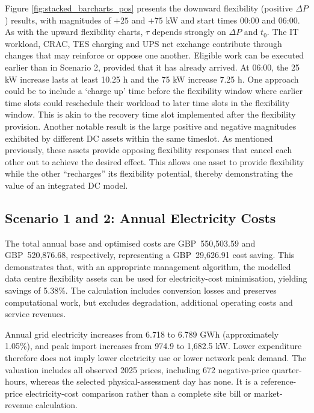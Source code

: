 \documentclass[lettersize,journal]{IEEEtran}
\newcommand{\rev}[1]{#1}
\begin{document}
\rev{Figure \ref{fig:stacked_barcharts_pos} presents the downward flexibility (positive $\Delta P$) results, with magnitudes of $+25$ and $+75$ kW and start times 00:00 and 06:00.} As  with the upward flexibility charts, $\tau$ depends strongly on  $\Delta P$ and $t_0$. The IT workload, CRAC, TES charging and UPS net exchange contribute through changes that may reinforce or oppose one another. Eligible work can be executed earlier than in Scenario 2, provided that it has already arrived. At 06:00, the 25 kW increase lasts at least 10.25 h and the 75 kW increase 7.25 h. One approach could be to include a `charge up' time before the flexibility window where earlier time slots could reschedule their workload to later time slots in the flexibility window. This is akin to the recovery time slot implemented after the flexibility provision. Another notable result is the large positive and negative magnitudes exhibited by different DC assets within the same timeslot. As mentioned previously, these assets provide opposing flexibility responses that cancel each other out to achieve the desired effect. This allows one asset to provide flexibility while the other ``recharges'' its flexibility potential, thereby demonstrating the value of an integrated DC model.

\subsection{Scenario 1 and 2: Annual Electricity Costs}
\rev{The total annual base and optimised costs are GBP~550,503.59 and GBP~520,876.68, respectively, representing a GBP~29,626.91 cost saving. This demonstrates that, with an appropriate management algorithm, the modelled data centre flexibility assets can be used for electricity-cost minimisation, yielding savings of 5.38\%. The calculation includes conversion losses and preserves computational work, but excludes degradation, additional operating costs and service revenues.}

Annual grid electricity increases from 6.718 to 6.789 GWh (approximately 1.05\%), and peak import increases from 974.9 to 1,682.5 kW. Lower expenditure therefore does not imply lower electricity use or lower network peak demand. The valuation includes all observed 2025 prices, including 672 negative-price quarter-hours, whereas the selected physical-assessment day has none. It is a reference-price electricity-cost comparison rather than a complete site bill or market-revenue calculation.
\end{document}
